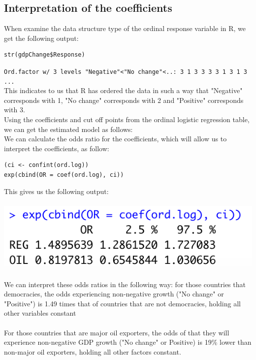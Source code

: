 \documentclass[12pt,letterpaper]{article}
\begin{document}
		
\subsection{Interpretation of the coefficients}

\noindent 
When examine the data structure type of the ordinal response variable in R, we get the following output:

\begin{lstlisting}
str(gdpChange$Response)
\end{lstlisting}
\texttt{Ord.factor w/ 3 levels "Negative"<"No change"<..: 3 1 3 3 3 3 1 3 1 3 ...}
\\


\noindent This indicates to us that R has ordered the data in such a way that "Negative" corresponds with 1, "No change" corresponds with 2 and "Positive" corresponds with 3.
\\

\noindent Using the coefficients and cut off points from the ordinal logistic regression table, we can get the estimated model as follows:
\\

\noindent We can calculate the odds ratio for the coefficients, which will allow us to interpret the coefficients, as follow:

\begin{lstlisting}
(ci <- confint(ord.log))
exp(cbind(OR = coef(ord.log), ci))
\end{lstlisting}

\noindent This gives us the following output:
\\\\
\includegraphics{ord.log.OR}
\\\\
\noindent We can interpret these odds ratios in the following way: for those countries that democracies, the odds experiencing non-negative growth ("No change" or "Positive") is 1.49 times that of countries that are not democracies, holding all other variables constant
\\\\
For those countries that are major oil exporters, the odds of that they will experience non-negative GDP growth ("No change" or Positive) is 19\% lower than non-major oil exporters, holding all other factors constant.
\end{document}
